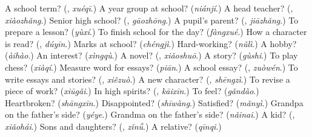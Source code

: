 \begin{tcolorbox}[breakable,colback=teal!4,colframe=teal!35!black,title={Before you move on}]
A school term? (\textbf{}, \emph{xuéqī}.) A year group at school? (\emph{niánjí}.) A head teacher? (\textbf{}, \emph{xiàozhǎng}.) Senior high school? (\textbf{}, \emph{gāozhōng}.) A pupil's parent? (\textbf{}, \emph{jiāzhǎng}.) To prepare a lesson? (\emph{yùxí}.) To finish school for the day? (\emph{fàngxué}.) How a character is read? (\textbf{}, \emph{dúyīn}.) Marks at school? (\emph{chéngjì}.) Hard-working? (\emph{nǔlì}.) A hobby? (\emph{àihào}.) An interest? (\emph{xìngqù}.) A novel? (\textbf{}, \emph{xiǎoshuō}.) A story? (\emph{gùshi}.) To play chess? (\emph{xiàqí}.) Measure word for essays? (\emph{piān}.) A school essay? (\textbf{}, \emph{zuòwén}.) To write essays and stories? (\textbf{}, \emph{xiězuò}.) A new character? (\textbf{}, \emph{shēngzì}.) To revise a piece of work? (\emph{xiūgǎi}.) In high spirits? (\textbf{}, \emph{kāixīn}.) To feel? (\emph{gǎndào}.) Heartbroken? (\emph{shāngxīn}.) Disappointed? (\emph{shīwàng}.) Satisfied? (\emph{mǎnyì}.) Grandpa on the father's side? (\emph{yéye}.) Grandma on the father's side? (\emph{nǎinai}.) A kid? (\textbf{}, \emph{xiǎohái}.) Sons and daughters? (\textbf{}, \emph{zǐnǚ}.) A relative? (\emph{qīnqi}.)
\end{tcolorbox}
